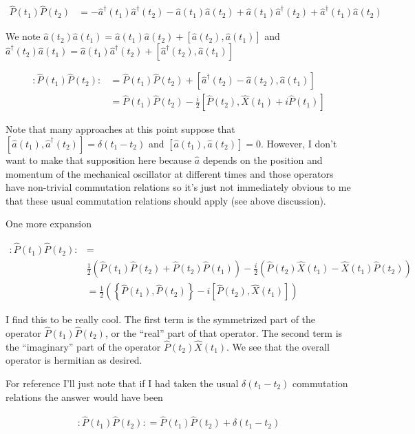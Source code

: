 \documentclass[12pt]{article}
\newcommand{\ahat}{\hat{a}}
\newcommand{\adag}{\ahat^{\dag}}
\begin{document}
\begin{align}
\hat{P}(t_1)\hat{P}(t_2)&=
-\adag(t_1)\adag(t_2) - \ahat(t_1)\ahat(t_2) + \ahat(t_1)\adag(t_2) + \adag(t_1)\ahat(t_2)
\end{align}

We note $\ahat(t_2)\ahat(t_1) = \ahat(t_1)\ahat(t_2)+[\ahat(t_2),\ahat(t_1)]$ and $\adag(t_2)\ahat(t_1) = \ahat(t_1)\adag(t_2)+[\adag(t_2),\ahat(t_1)]$

\begin{align}
:\hat{P}(t_1)\hat{P}(t_2): &= \hat{P}(t_1)\hat{P}(t_2) + [\adag(t_2)-\ahat(t_2),\ahat(t_1)]\\
&=\hat{P}(t_1)\hat{P}(t_2) - \frac{i}{2}[\hat{P}(t_2),\hat{X}(t_1)+i\hat{P}(t_1)]
\end{align}

Note that many approaches at this point suppose that $[\ahat(t_1),\adag(t_2)] = \delta(t_1-t_2)$ and $[\ahat(t_1),\ahat(t_2)] = 0$. However, I don't want to make that supposition here because $\ahat$ depends on the position and momentum of the mechanical oscillator at different times and those  operators have non-trivial commutation relations so it's just not immediately obvious to me that these usual commutation relations should apply (see above discussion).

One more expansion

\begin{align}
:\hat{P}(t_1)\hat{P}(t_2): &=\\
& \frac{1}{2}\left(\hat{P}(t_1)\hat{P}(t_2) + \hat{P}(t_2)\hat{P}(t_1)\right)-\frac{i}{2}\left(\hat{P}(t_2)\hat{X}(t_1)-\hat{X}(t_1)\hat{P}(t_2)\right)\\
&= \frac{1}{2}\left(\left\{\hat{P}(t_1),\hat{P}(t_2)\right\} - i \left[\hat{P}(t_2),\hat{X}(t_1)\right]\right)
\end{align}

I find this to be really cool. The first term is the symmetrized part of the operator $\hat{P}(t_1)\hat{P}(t_2)$, or the ``real'' part of that operator. The second term is the ``imaginary'' part of the operator $\hat{P}(t_2)\hat{X}(t_1)$. We see that the overall operator is hermitian as desired.

For reference I'll just note that if I had taken the usual $\delta(t_1-t_2)$ commutation relations the answer would have been

\begin{align}
:\hat{P}(t_1)\hat{P}(t_2): = \hat{P}(t_1)\hat{P}(t_2) + \delta(t_1-t_2)
\end{align}
\end{document}
